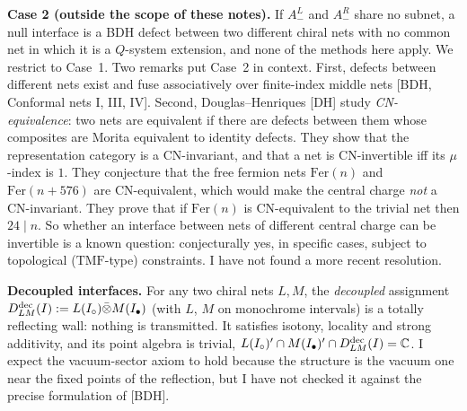 \documentclass[11pt]{article}
\theoremstyle{definition}
\theoremstyle{remark}
\begin{document}
\textbf{Case 2 (outside the scope of these notes).} If $A^L_-$ and $A^R_-$ share no subnet, a null interface is a BDH defect between two different chiral nets with no common net in which it is a $Q$-system extension, and none of the methods here apply. We restrict to Case~1. Two remarks put Case~2 in context. First, defects between different nets exist and fuse associatively over finite-index middle nets [BDH, Conformal nets I, III, IV]. Second, Douglas--Henriques [DH] study \emph{CN-equivalence}: two nets are equivalent if there are defects between them whose composites are Morita equivalent to identity defects. They show that the representation category is a CN-invariant, and that a net is CN-invertible iff its $\mu$-index is $1$. They conjecture that the free fermion nets $\mathrm{Fer}(n)$ and $\mathrm{Fer}(n+576)$ are CN-equivalent, which would make the central charge \emph{not} a CN-invariant. They prove that if $\mathrm{Fer}(n)$ is CN-equivalent to the trivial net then $24\mid n$. So whether an interface between nets of different central charge can be invertible is a known question: conjecturally yes, in specific cases, subject to topological ($\mathrm{TMF}$-type) constraints. I have not found a more recent resolution.

\textbf{Decoupled interfaces.} For any two chiral nets $L,M$, the \emph{decoupled} assignment $D^{\rm dec}_{LM}(I):=L(I_\circ)\bar\otimes M(I_\bullet)$ (with $L$, $M$ on monochrome intervals) is a totally reflecting wall: nothing is transmitted. It satisfies isotony, locality and strong additivity, and its point algebra is trivial, $L(I_\circ)'\cap M(I_\bullet)'\cap D^{\rm dec}_{LM}(I)=\mathbb C$. I expect the vacuum-sector axiom to hold because the structure is the vacuum one near the fixed points of the reflection, but I have not checked it against the precise formulation of [BDH].
\end{document}
